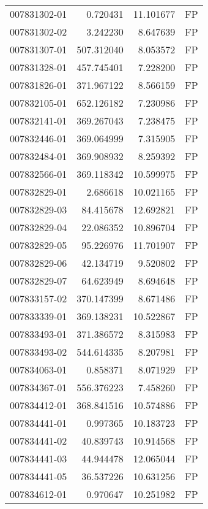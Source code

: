 \begin{tabular}{lrrl}
007831302-01 &    0.720431 &      11.101677 &   FP \\
007831302-02 &    3.242230 &       8.647639 &   FP \\
007831307-01 &  507.312040 &       8.053572 &   FP \\
007831328-01 &  457.745401 &       7.228200 &   FP \\
007831826-01 &  371.967122 &       8.566159 &   FP \\
007832105-01 &  652.126182 &       7.230986 &   FP \\
007832141-01 &  369.267043 &       7.238475 &   FP \\
007832446-01 &  369.064999 &       7.315905 &   FP \\
007832484-01 &  369.908932 &       8.259392 &   FP \\
007832566-01 &  369.118342 &      10.599975 &   FP \\
007832829-01 &    2.686618 &      10.021165 &   FP \\
007832829-03 &   84.415678 &      12.692821 &   FP \\
007832829-04 &   22.086352 &      10.896704 &   FP \\
007832829-05 &   95.226976 &      11.701907 &   FP \\
007832829-06 &   42.134719 &       9.520802 &   FP \\
007832829-07 &   64.623949 &       8.694648 &   FP \\
007833157-02 &  370.147399 &       8.671486 &   FP \\
007833339-01 &  369.138231 &      10.522867 &   FP \\
007833493-01 &  371.386572 &       8.315983 &   FP \\
007833493-02 &  544.614335 &       8.207981 &   FP \\
007834063-01 &    0.858371 &       8.071929 &   FP \\
007834367-01 &  556.376223 &       7.458260 &   FP \\
007834412-01 &  368.841516 &      10.574886 &   FP \\
007834441-01 &    0.997365 &      10.183723 &   FP \\
007834441-02 &   40.839743 &      10.914568 &   FP \\
007834441-03 &   44.944478 &      12.065044 &   FP \\
007834441-05 &   36.537226 &      10.631256 &   FP \\
007834612-01 &    0.970647 &      10.251982 &   FP \\

\end{tabular}
